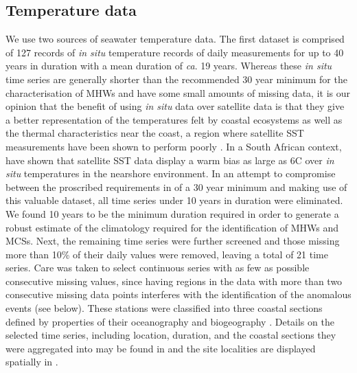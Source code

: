 \documentclass[a4paper,10pt,review]{elsarticle}
\begin{document}
\subsection{Temperature data}
We use two sources of seawater temperature data. The first dataset is comprised of 127 records of \emph{in situ} temperature records of daily measurements for up to 40 years in duration with a mean duration of \emph{ca}. 19 years. Whereas these \emph{in situ} time series are generally shorter than the recommended 30 year minimum for the characterisation of MHWs \citep{Hobday2016} and have some small amounts of missing data, it is our opinion that the benefit of using \emph{in situ} data over satellite data is that they give a better representation of the temperatures felt by coastal ecosystems as well as the thermal characteristics near the coast, a region where satellite SST measurements have been shown to perform poorly \citep[e.g.][]{Smale2009, Castillo2010}. In a South African context, \citet{Smit2013} have shown that satellite SST data display a warm bias as large as 6\degree C over \emph{in situ} temperatures in the nearshore environment. In an attempt to compromise between the proscribed requirements in \citet{Hobday2016} of a 30 year minimum and making use of this valuable dataset, all time series under 10 years in duration were eliminated. We found 10 years to be the minimum duration required in order to generate a robust estimate of the climatology required for the identification of MHWs and MCSs. Next, the remaining time series were further screened and those missing more than 10\% of their daily values were removed, leaving a total of 21 time series. Care was taken to select continuous series with as few as possible consecutive missing values, since having regions in the data with more than two consecutive missing data points interferes with the identification of the anomalous events (see below). These stations were classified into three coastal sections defined by properties of their oceanography and biogeography \cite{Smit2013}. Details on the selected time series, including location, duration, and the coastal sections they were aggregated into may be found in  and the site localities are displayed spatially in .
\end{document}
